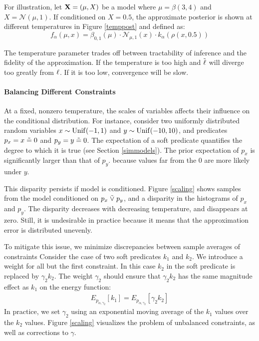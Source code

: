 For illustration, let $\mathbf{X} = (\mu, X)$ be a model where $\mu = \beta(3, 4)$ and $X = \mathcal{N}(\mu, 1)$.
If conditioned on $X = 0.5$, the approximate posterior is shown at different temperatures in Figure \ref{temppost} and defined as:
\begin{equation}\label{approxposterior}
f_\alpha(\mu, x) = \beta_{0,1}(\mu) \cdot \mathcal{N}_{\mu,1}(x) \cdot k_\alpha(\rho(x, 0.5)) 
\end{equation}

The temperature parameter trades off between tractability of inference and the fidelity of the approximation.
If the temperature is too high and $\mathrel{\tilde{\operatorname{\ell}}}$ will diverge too greatly from $\operatorname{\ell}$. If it is too low, convergence will be slow.

\paragraph{Balancing Different Constraints}
At a fixed, nonzero temperature, the scales of variables affects their influence on
the conditional distribution.
For instance, consider two uniformly distributed random variables $x \sim \operatorname{Unif}(-1, 1)$ and $y \sim \operatorname{Unif}(-10, 10)$,
and predicates $p_x = x \mathrel{\tilde{=}} 0$ and $p_y = y \mathrel{\tilde{=}} 0$.
The expectation of a soft predicate quantifies the degree to which it is true (see Section \ref{simmodels}).
The prior expectation of $p_x$ is significantly larger than that of $p_y$.
because values far from the 0 are more likely under $y$.

This disparity persists if model is conditioned.
Figure \ref{scaling} shows samples from the model conditioned on $p_x \mathrel{\tilde{\lor}} p_y$, and a disparity in the histograms of $p_x$ and $p_y$.
The disparity decreases with decreasing temperature, and disappears at zero.
Still, it is undesirable in practice because it means that the approximation error is distributed unevenly.

To mitigate this issue, we minimize discrepancies between sample averages of constraints
Consider the case of two 
soft predicates $k_1$ and $k_2$. We introduce a weight for all but the first constraint.
In this case $k_2$ in the soft predicate is replaced
by $\gamma_2 k_2$. The weight $\gamma_2$ should
ensure that $\gamma_2 k_2$ has the same
magnitude effect as $k_1$ on the energy
function:
\begin{align*}
E_{p_{\alpha, \gamma_2}}[k_1] = E_{p_{\alpha, \gamma_2}}[\gamma_2 k_2] 
\end{align*}
In practice, we set $\gamma_2$ using an exponential moving
average of the $k_1$ values over the $k_2$ values.
Figure \ref{scaling} visualizes the problem of unbalanced constraints, as well as corrections to $\gamma$.


